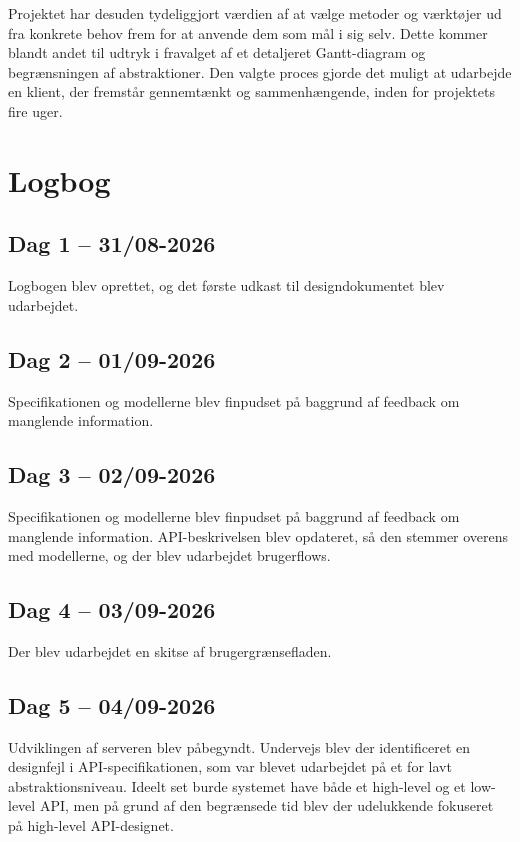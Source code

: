\documentclass[a4paper, 11pt]{article}
\begin{document}
Projektet har desuden tydeliggjort værdien af at vælge metoder og værktøjer ud fra konkrete
behov frem for at anvende dem som mål i sig selv. Dette kommer blandt andet til udtryk i
fravalget af et detaljeret Gantt-diagram og begrænsningen af abstraktioner. Den valgte
proces gjorde det muligt at udarbejde en klient, der fremstår gennemtænkt og sammenhængende,
inden for projektets fire uger.

\printbibliography[title={Referencer}]

\appendix

\section{Logbog}

\subsection{Dag 1 -- 31/08-2026}

Logbogen blev oprettet, og det første udkast til designdokumentet blev udarbejdet.

\subsection{Dag 2 -- 01/09-2026}

Specifikationen og modellerne blev finpudset på baggrund af feedback om manglende information.

\subsection{Dag 3 -- 02/09-2026}

Specifikationen og modellerne blev finpudset på baggrund af feedback om manglende information.
API-beskrivelsen blev opdateret, så den stemmer overens med modellerne, og der blev udarbejdet
brugerflows.

\subsection{Dag 4 -- 03/09-2026}

Der blev udarbejdet en skitse af brugergrænsefladen.

\subsection{Dag 5 -- 04/09-2026}

Udviklingen af serveren blev påbegyndt. Undervejs blev der identificeret en designfejl i
API-specifikationen, som var blevet udarbejdet på et for lavt abstraktionsniveau. Ideelt set burde
systemet have både et high-level og et low-level API, men på grund af den begrænsede tid blev der
udelukkende fokuseret på high-level API-designet.
\end{document}
